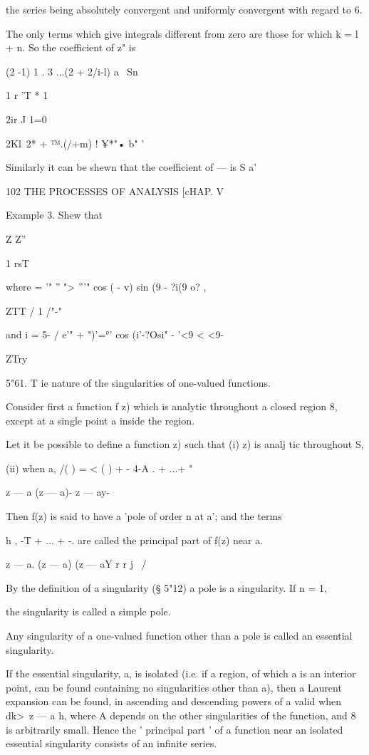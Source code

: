 {{{{the series being absolutely convergent and uniformly convergent with regard to 6. 

The only terms which give integrals different from zero are those for which k = l + n. 
So the coefficient of z" is 

(2 -1) 1 . 3 ...(2  + 2/i-l) a  \ Sn 



1 r 'T * 1 

2ir J 1=0 



2Kl\ 2* + ™.(/+m) ! ¥*"• b" ' 



Similarly it can be shewn that the coefficient of — is S  a'\ 



102 THE PROCESSES OF ANALYSIS [cHAP. V 

Example 3. Shew that 

Z Z'' 

1 rsT 

where    =    '" '' "> '''"   cos  (  - v) sin (9 - ?i(9  o? , 

ZTT / 
1 /"-"  

and  i = 5- / e'" + ")'=°' cos (i'-?Osi" - '<9 < <9- 

ZTry 

5"61. T ie nature of the singularities of one-valued functions. 

Consider first a function f z) which is analytic throughout a closed 
region 8, except at a single point a inside the region. 

Let it be possible to define a function    z) such that 
(i)    z) is analj tic throughout S, 

(ii) when  a, /( ) = < ( ) + - 4-A .  + ...+  " 



z — a (z — a)-  z — ay- 

Then f(z) is said to have a 'pole of order n at a'; and the terms 

h ,  -T  + ... + -.   are called the principal part of f(z) near a. 

z — a. (z — a)  (z — aY r r j \ / 

By the definition of a singularity (§ 5"12) a pole is a singularity. If n = 1, 

the singularity is called a simple pole. 

Any singularity of a one-valued function other than a pole is called an 
essential singularity. 

If the essential singularity, a, is isolated (i.e. if a region, of which a is an 
interior point, can be found containing no singularities other than a), then a 
Laurent expansion can be found, in ascending and descending powers of a 
valid when dk>\ z — a h, where A depends on the other singularities of the 
function, and 8 is arbitrarily small. Hence the ' principal part ' of a function 
near an isolated essential singularity consists of an infinite series. 

}}}}
